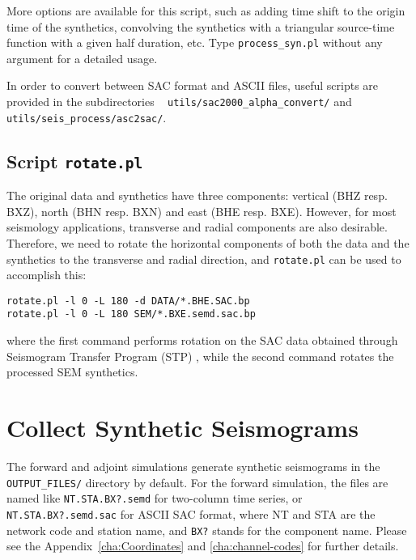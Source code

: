 More options are available for this script, such as adding time shift
to the origin time of the synthetics, convolving the synthetics with
a triangular source-time function with a given half duration, etc.
Type \texttt{process\_syn.pl} without any argument for a detailed
usage.\newline

In order to convert between SAC format and ASCII files, useful scripts
are provided in the subdirectories ~\newline
 \texttt{utils/sac2000\_alpha\_convert/} and \texttt{utils/seis\_process/asc2sac/}.


\subsection{Script \texttt{rotate.pl}}

The original data and synthetics have three components: vertical (BHZ
resp. BXZ), north (BHN resp. BXN) and east (BHE resp. BXE). However,
for most seismology applications, transverse and radial components
are also desirable. Therefore, we need to rotate the horizontal components
of both the data and the synthetics to the transverse and radial direction,
and \texttt{\small rotate.pl}{\small{} can be used to accomplish this:}{\small \par}
\begin{verbatim}
rotate.pl -l 0 -L 180 -d DATA/*.BHE.SAC.bp
rotate.pl -l 0 -L 180 SEM/*.BXE.semd.sac.bp
\end{verbatim}
where the first command performs rotation on the SAC data obtained
through Seismogram Transfer Program (STP) ,
while the second command rotates the processed SEM synthetics.


\section{Collect Synthetic Seismograms}

The forward and adjoint simulations generate synthetic seismograms
in the \texttt{OUTPUT\_FILES/} directory by default. For the forward
simulation, the files are named like \texttt{NT.STA.BX?.semd} for
two-column time series, or \texttt{NT.STA.BX?.semd.sac} for ASCII
SAC format, where NT and STA are the network code and station name,
and \texttt{BX?} stands for the component name. Please see the Appendix~\ref{cha:Coordinates}
and \ref{cha:channel-codes} for further details.\newline

